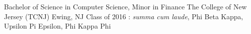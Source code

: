 

\begin{cventries}

  \cventry
    {Bachelor of Science in Computer Science, Minor in Finance} %
    {The College of New Jersey (TCNJ)} %
    {Ewing, NJ} %
    {Class of 2016} %
    {: \emph{summa cum laude}, Phi Beta Kappa, Upsilon Pi Epsilon, Phi Kappa Phi}

\end{cventries}
